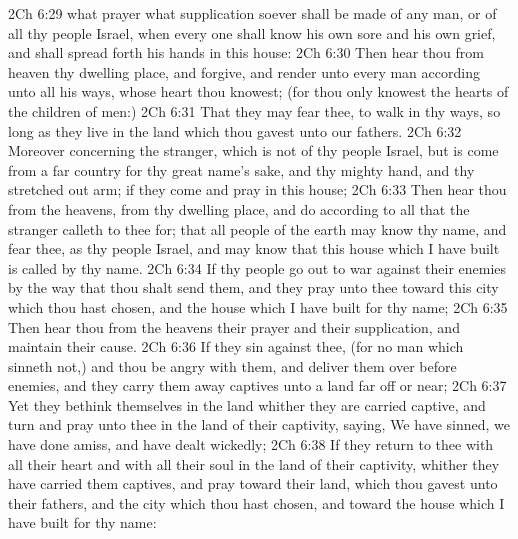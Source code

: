 \vs 2Ch 6:29  what prayer  what supplication soever shall be made of any man, or of all thy people Israel, when every one shall know his own sore and his own grief, and shall spread forth his hands in this house:
\vs 2Ch 6:30 Then hear thou from heaven thy dwelling place, and forgive, and render unto every man according unto all his ways, whose heart thou knowest; (for thou only knowest the hearts of the children of men:)
\vs 2Ch 6:31 That they may fear thee, to walk in thy ways, so long as they live in the land which thou gavest unto our fathers.
\vs 2Ch 6:32 Moreover concerning the stranger, which is not of thy people Israel, but is come from a far country for thy great name's sake, and thy mighty hand, and thy stretched out arm; if they come and pray in this house;
\vs 2Ch 6:33 Then hear thou from the heavens,  from thy dwelling place, and do according to all that the stranger calleth to thee for; that all people of the earth may know thy name, and fear thee, as  thy people Israel, and may know that this house which I have built is called by thy name.
\vs 2Ch 6:34 If thy people go out to war against their enemies by the way that thou shalt send them, and they pray unto thee toward this city which thou hast chosen, and the house which I have built for thy name;
\vs 2Ch 6:35 Then hear thou from the heavens their prayer and their supplication, and maintain their cause.
\vs 2Ch 6:36 If they sin against thee, (for  no man which sinneth not,) and thou be angry with them, and deliver them over before  enemies, and they carry them away captives unto a land far off or near;
\vs 2Ch 6:37 Yet  they bethink themselves in the land whither they are carried captive, and turn and pray unto thee in the land of their captivity, saying, We have sinned, we have done amiss, and have dealt wickedly;
\vs 2Ch 6:38 If they return to thee with all their heart and with all their soul in the land of their captivity, whither they have carried them captives, and pray toward their land, which thou gavest unto their fathers, and  the city which thou hast chosen, and toward the house which I have built for thy name:
